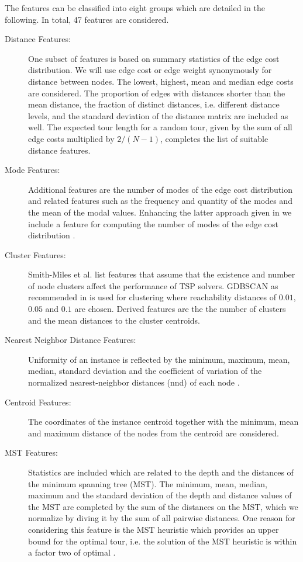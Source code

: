 \documentclass{article}
\begin{document}
The features can be classified into eight groups which are detailed in
the following. In total, 47 features are considered.
\begin{description}
\item[Distance Features:] One subset of features is based on summary
  statistics of the edge cost distribution. We will use edge cost or
  edge weight synonymously for distance between nodes.
  The lowest, highest, mean and median edge costs are
  considered. The proportion of edges with distances shorter than the
  mean distance, the fraction of distinct distances, i.e. different
  distance levels, and the standard deviation of the distance matrix
  are included as well. The expected tour length for a random tour,
  given by the sum of all edge costs multiplied by $2/(N-1)$,
  completes the list of suitable distance features.

\item[Mode Features:] Additional features \cite{KCHS11} are the number
  of modes of the edge cost distribution and related features such as
  the frequency and quantity of the modes and the mean of the modal
  values. Enhancing the latter approach given in \cite{KCHS11} we
  include a feature for computing the number of modes of the edge cost
  distribution \cite{MBTPWR11}.

\item[Cluster Features:] Smith-Miles et al. \cite{SH11,SMHL10} list
  features that assume that the existence and number of node clusters
  affect the performance of TSP solvers. GDBSCAN \cite{Sander98} as
  recommended in \cite{SMHL10} is used for clustering where
  reachability distances of $0.01$, $0.05$ and $0.1$ are
  chosen. Derived features are the the number of clusters and the mean
  distances to the cluster centroids.

\item[Nearest Neighbor Distance Features:] Uniformity of an instance
  is reflected by the minimum, maximum, mean, median, standard
  deviation and the coefficient of variation of the normalized
  nearest-neighbor distances (nnd) of each node \cite{SH11,SMHL10}.

\item[Centroid Features:] The coordinates of the instance centroid
  together with the minimum, mean and maximum distance of the nodes
  from the centroid are considered.

\item[MST Features:] Statistics are included which are related to the
  depth and the distances of the minimum spanning tree (MST). The
  minimum, mean, median, maximum and the standard deviation of the
  depth and distance values of the MST are completed by the sum of the
  distances on the MST, which we normalize by diving it by the sum of
  all pairwise distances. One reason for considering this feature is
  the MST heuristic which provides an upper bound for the optimal
  tour, i.e. the solution of the MST heuristic is within a factor two
  of optimal \cite{BT97}.


\end{description}
\end{document}
